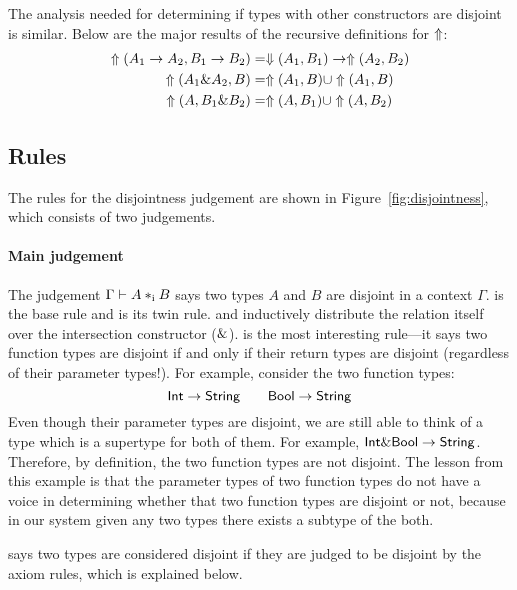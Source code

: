 The analysis needed for determining if types with other constructors are
disjoint is similar. Below are the major results of the recursive definitions for
$\Uparrow$:
\begin{align*}
  \Uparrow(A_1 \to A_2, B_1 \to B_2) &= \Downarrow(A_1,B_1) \to \Uparrow(A_2,B_2) \\
  \Uparrow({A_1 \& A_2, B})      &= \Uparrow(A_1, B) \cup \Uparrow(A_1,B) \\
  \Uparrow({A, B_1 \& B_2})      &= \Uparrow(A, B_1) \cup \Uparrow(A,B_2)
\end{align*}

\subsection{Rules}

The rules for the disjointness judgement are shown in
Figure~\ref{fig:disjointness}, which consists of two judgements.

\paragraph{Main judgement} The judgement $\Gamma \vdash A *_\textnormal{i} B$ says two types
$A$ and $B$ are disjoint in a context $\Gamma$.  is the
base rule and  is its twin rule.
 and  inductively distribute
the relation itself over the intersection constructor ($\&$).
 is the most interesting rule---it says two function
types are disjoint if and only if their return types are disjoint (regardless of
their parameter types!). For example, consider the two function types:
\[ \textsf{Int} \to \textsf{String} \qquad \textsf{Bool} \to \textsf{String} \]
Even though their parameter types are disjoint, we are still able to think of a
type which is a supertype for both of them. For example, $ \textsf{Int} \& \textsf{Bool}
\to \textsf{String} $. Therefore, by definition, the two function types are not
disjoint. The lesson from this example is that the parameter types of two
function types do not have a voice in determining whether that two function
types are disjoint or not, because in our system given any two types there
exists a subtype of the both.

 says two types are considered disjoint if they are
judged to be disjoint by the axiom rules, which is explained below.

